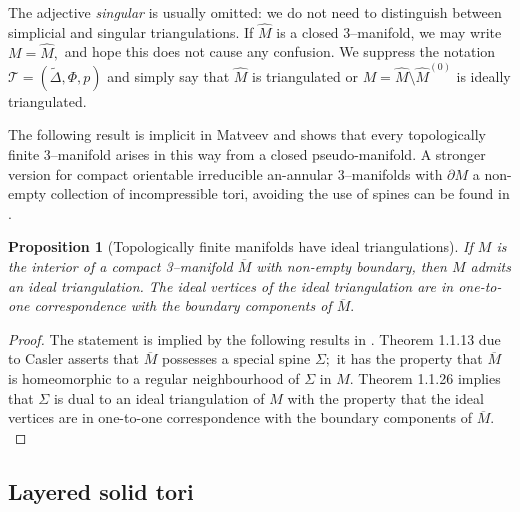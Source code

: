 \documentclass[a4paper]{gtart}
\def\tri{\mathcal{T}}
\def\manifold{M}
\theoremstyle{plain}
\newtheorem{proposition}[theorem]{Proposition}
\theoremstyle{definition}
\theoremstyle{remark}
\numberwithin{equation}{section}
\begin{document}
The adjective \emph{singular} is usually omitted: we do not need to distinguish between simplicial and singular triangulations. If $\widehat{\manifold}$ is a closed 3--manifold, we may write $M = \widehat{\manifold},$ and hope this does not cause any confusion. We suppress the notation $\tri = ( \widetilde{\Delta}, \Phi, p)$ and simply say that $\widehat{\manifold}$ is triangulated or $\manifold = \widehat{\manifold}\setminus \widehat{\manifold}^{(0)}$ is ideally triangulated.


The following result is implicit in Matveev \cite{Matveev-algorithmic-2007} and shows that every topologically finite 3--manifold arises in this way from a closed pseudo-manifold. A stronger version for compact orientable irreducible an-annular 3--manifolds with $\partial \manifold$ a non-empty collection of incompressible tori, avoiding the use of spines can be found in \cite[Theorem 1]{Lackenby00TautIdeal}. 

\begin{proposition}[Topologically finite manifolds have ideal triangulations]\label{pro:ideal triangulation exists}
If $\manifold$ is the interior of a compact 3--manifold $\overline{\manifold}$ with non-empty boundary, then $\manifold$ admits an ideal triangulation. The ideal vertices of the ideal triangulation are in one-to-one correspondence with the boundary components of $\overline{\manifold}.$
\end{proposition}

\begin{proof}
The statement is implied by the following results in \cite{Matveev-algorithmic-2007}. Theorem 1.1.13 due to Casler asserts that $\overline{\manifold}$ possesses a special spine $\Sigma;$ it has the property that $\overline{\manifold}$ is homeomorphic to a regular neighbourhood of $\Sigma$ in $\manifold .$ Theorem 1.1.26 implies that $\Sigma$ is dual to an ideal triangulation of $\manifold$ with the property that the ideal vertices are in one-to-one correspondence with the boundary components of $\overline{\manifold}.$
\end{proof}


\subsection{Layered solid tori}
\label{sec:lst}
\end{document}
